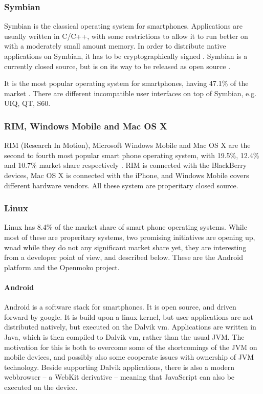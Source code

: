 \documentclass[11pt]{report}
\begin{document}
\subsubsection{Symbian}

Symbian is the classical operating system for smartphones. Applications are usually written in C/C++, with some restrictions to allow it to run better on with a moderately small amount memory. 
In order to distribute native applications on Symbian, it has to be cryptographically signed \cite{symbiansigned}.
Symbian is a currently closed source, but is on its way to be released as open source \cite{symbianopensource}.

It is the most popular operating system for smartphones, having 47.1\% of the market \cite{gartner-phone-survey-2008q4}. There are different incompatible user interfaces on top of Symbian, e.g. UIQ, QT, S60. 

\subsubsection{RIM, Windows Mobile and Mac OS X}

RIM (Research In Motion), Microsoft Windows Mobile and Mac OS X are the second to fourth most popular smart phone operating system, with 19.5\%, 12.4\% and 10.7\% market share respectively \cite{gartner-phone-survey-2008q4}.
RIM is connected with the BlackBerry devices, Mac OS X is connected with the iPhone, and Windows Mobile covers different hardware vendors. 
All these system are properitary closed source.

\subsubsection{Linux}

Linux has 8.4\% of the market share of smart phone operating systems.
While most of these are properitary systems, two promising initiatives are opening up, wnad while they do not any significant market share yet, they are interesting from a developer point of view, and described below. These are the Android platform and the Openmoko project.


\paragraph{Android}

Android is a software stack for smartphones. It is open source, and driven forward by google.
It is build upon a linux kernel, but user applications are not distributed natively, but executed on the Dalvik vm. Applications are written in Java, which is then compiled to Dalvik vm, rather than the usual JVM. The motivation for this is both to overcome some of the shortcomings of the JVM on mobile devices, and possibly also some cooperate issues with ownership of JVM technology.
Beside supporting Dalvik applications, there is also a modern webbrowser -- a WebKit derivative -- meaning that JavaScript can also be executed on the device.
\end{document}

